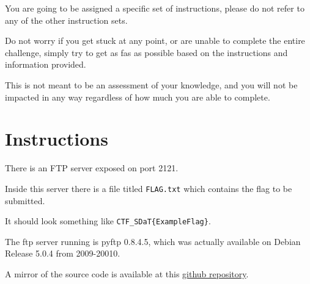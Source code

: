 {{{                You are going to be assigned a specific set of instructions, please do not refer to any of the other instruction sets.







                Do not worry if you get stuck at any point, or are unable to complete the entire challenge, simply try to get as fas as possible based on the instructions and information provided. %







This is not meant to be an assessment of your knowledge, and you will not be impacted in any way regardless of how much you are able to complete. 















                \section*{Instructions}







                    There is an FTP server exposed on port 2121. %







Inside this server there is a file titled \lstinline`FLAG.txt` which contains the flag to be submitted. %







It should look something like \lstinline`CTF_SDaT{ExampleFlag}`. %







The ftp server running is pyftp 0.8.4.5, which was actually available on Debian Release 5.0.4 from 2009-20010. %







A mirror of the source code is available at this \href{https://github.com/brendonky18/pyftpd-0.8.4.5_mirror}{github repository}.















}}}
